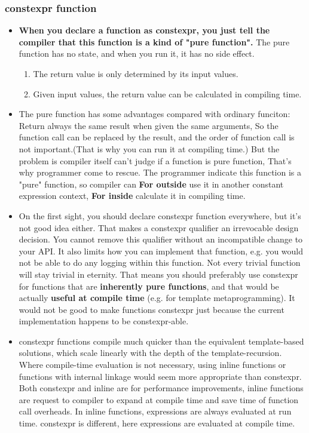 \documentclass[a4paper,11pt,twoside]{book}
\begin{document}
\subsubsection{constexpr function}
\begin{itemize}
	\item \textbf{When you declare a function as constexpr, you just tell the compiler that this function is a kind of "pure function".} The pure function has no state, and when you run it, it has no side effect.
	\begin{enumerate}
		\item The return value is only determined by its input values.
		\item Given input values, the return value can be calculated in compiling time. 
	\end{enumerate}
	
	
	\item The pure function has some advantages compared with ordinary funciton: Return always the same result when given the same arguments, So the function call can be replaced by the result, and the order of function call is not important.(That is why you can run it at compiling time.) But the problem is compiler itself can't judge if a function is pure function, That's why programmer come to rescue. The programmer indicate this function is a "pure" function, so compiler can \textbf{For outside} use it in another constant expression context, \textbf{For inside} calculate it in compiling time. 
	
	\item On the first sight, you should declare constexpr function everywhere, but it's not good idea either. That makes a constexpr qualifier an irrevocable design decision. You cannot remove this qualifier without an incompatible change to your API. It also limits how you can implement that function, e.g. you would not be able to do any logging within this function. Not every trivial function will stay trivial in eternity. That means you should preferably use constexpr for functions that are \textbf{inherently pure functions}, and that would be actually \textbf{useful at compile time} (e.g. for template metaprogramming). It would not be good to make functions constexpr just because the current implementation happens to be constexpr-able.
	
	\item constexpr functions compile much quicker than the equivalent template-based solutions, which scale linearly with the depth of the template-recursion. Where compile-time evaluation is not necessary, using inline functions or functions with internal linkage would seem more appropriate than constexpr. Both constexpr and inline are for performance improvements, inline functions are request to compiler to expand at compile time and save time of function call overheads. In inline functions, expressions are always evaluated at run time. constexpr is different, here expressions are evaluated at compile time.
	

\end{itemize}
\end{document}
